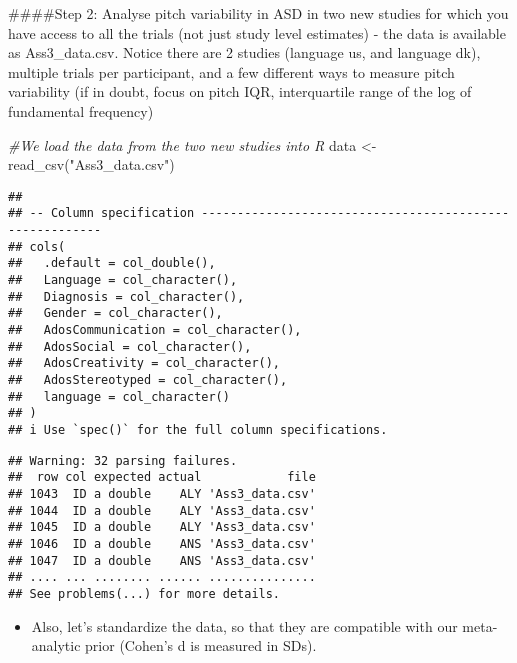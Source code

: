 \documentclass[
]{article}
\newenvironment{Shaded}{\begin{snugshade}}{\end{snugshade}}
\newcommand{\CommentTok}[1]{\textcolor[rgb]{0.56,0.35,0.01}{\textit{#1}}}
\newcommand{\FunctionTok}[1]{\textcolor[rgb]{0.00,0.00,0.00}{#1}}
\newcommand{\NormalTok}[1]{#1}
\newcommand{\OtherTok}[1]{\textcolor[rgb]{0.56,0.35,0.01}{#1}}
\newcommand{\SpecialCharTok}[1]{\textcolor[rgb]{0.00,0.00,0.00}{#1}}
\newcommand{\StringTok}[1]{\textcolor[rgb]{0.31,0.60,0.02}{#1}}
\providecommand{\tightlist}{%
  \setlength{\itemsep}{0pt}\setlength{\parskip}{0pt}}
\begin{document}
\#\#\#\#Step 2: Analyse pitch variability in ASD in two new studies for
which you have access to all the trials (not just study level estimates)
- the data is available as Ass3\_data.csv. Notice there are 2 studies
(language us, and language dk), multiple trials per participant, and a
few different ways to measure pitch variability (if in doubt, focus on
pitch IQR, interquartile range of the log of fundamental frequency)

\begin{Shaded}
\begin{Highlighting}[]
\CommentTok{\#We load the data from the two new studies into R}
\NormalTok{data }\OtherTok{\textless{}{-}} \FunctionTok{read\_csv}\NormalTok{(}\StringTok{"Ass3\_data.csv"}\NormalTok{)}
\end{Highlighting}
\end{Shaded}

\begin{verbatim}
## 
## -- Column specification --------------------------------------------------------
## cols(
##   .default = col_double(),
##   Language = col_character(),
##   Diagnosis = col_character(),
##   Gender = col_character(),
##   AdosCommunication = col_character(),
##   AdosSocial = col_character(),
##   AdosCreativity = col_character(),
##   AdosStereotyped = col_character(),
##   language = col_character()
## )
## i Use `spec()` for the full column specifications.
\end{verbatim}

\begin{verbatim}
## Warning: 32 parsing failures.
##  row col expected actual            file
## 1043  ID a double    ALY 'Ass3_data.csv'
## 1044  ID a double    ALY 'Ass3_data.csv'
## 1045  ID a double    ALY 'Ass3_data.csv'
## 1046  ID a double    ANS 'Ass3_data.csv'
## 1047  ID a double    ANS 'Ass3_data.csv'
## .... ... ........ ...... ...............
## See problems(...) for more details.
\end{verbatim}

\begin{itemize}
\tightlist
\item
  Also, let's standardize the data, so that they are compatible with our
  meta-analytic prior (Cohen's d is measured in SDs).
\end{itemize}

\begin{Shaded}
\end{Shaded}
\end{document}
